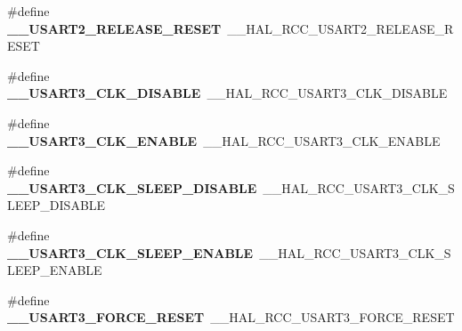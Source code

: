 \begin{DoxyCompactItemize}
\item 
\mbox{\label{group___h_a_l___r_c_c___aliased_ga0b8442b95cc856fb66c66874d511c5bb}} 
\#define {\bfseries \+\_\+\+\_\+\+U\+S\+A\+R\+T2\+\_\+\+R\+E\+L\+E\+A\+S\+E\+\_\+\+R\+E\+S\+ET}~\+\_\+\+\_\+\+H\+A\+L\+\_\+\+R\+C\+C\+\_\+\+U\+S\+A\+R\+T2\+\_\+\+R\+E\+L\+E\+A\+S\+E\+\_\+\+R\+E\+S\+ET
\item 
\mbox{\label{group___h_a_l___r_c_c___aliased_ga5493319829b9739c7495cc765162f4b3}} 
\#define {\bfseries \+\_\+\+\_\+\+U\+S\+A\+R\+T3\+\_\+\+C\+L\+K\+\_\+\+D\+I\+S\+A\+B\+LE}~\+\_\+\+\_\+\+H\+A\+L\+\_\+\+R\+C\+C\+\_\+\+U\+S\+A\+R\+T3\+\_\+\+C\+L\+K\+\_\+\+D\+I\+S\+A\+B\+LE
\item 
\mbox{\label{group___h_a_l___r_c_c___aliased_ga821236fc8d13c8b707128514c0a42a02}} 
\#define {\bfseries \+\_\+\+\_\+\+U\+S\+A\+R\+T3\+\_\+\+C\+L\+K\+\_\+\+E\+N\+A\+B\+LE}~\+\_\+\+\_\+\+H\+A\+L\+\_\+\+R\+C\+C\+\_\+\+U\+S\+A\+R\+T3\+\_\+\+C\+L\+K\+\_\+\+E\+N\+A\+B\+LE
\item 
\mbox{\label{group___h_a_l___r_c_c___aliased_ga32b28245d8d5a75b7182779315cb74d8}} 
\#define {\bfseries \+\_\+\+\_\+\+U\+S\+A\+R\+T3\+\_\+\+C\+L\+K\+\_\+\+S\+L\+E\+E\+P\+\_\+\+D\+I\+S\+A\+B\+LE}~\+\_\+\+\_\+\+H\+A\+L\+\_\+\+R\+C\+C\+\_\+\+U\+S\+A\+R\+T3\+\_\+\+C\+L\+K\+\_\+\+S\+L\+E\+E\+P\+\_\+\+D\+I\+S\+A\+B\+LE
\item 
\mbox{\label{group___h_a_l___r_c_c___aliased_gad2b6888f9a8ef85b727f7eabf6501d2f}} 
\#define {\bfseries \+\_\+\+\_\+\+U\+S\+A\+R\+T3\+\_\+\+C\+L\+K\+\_\+\+S\+L\+E\+E\+P\+\_\+\+E\+N\+A\+B\+LE}~\+\_\+\+\_\+\+H\+A\+L\+\_\+\+R\+C\+C\+\_\+\+U\+S\+A\+R\+T3\+\_\+\+C\+L\+K\+\_\+\+S\+L\+E\+E\+P\+\_\+\+E\+N\+A\+B\+LE
\item 
\mbox{\label{group___h_a_l___r_c_c___aliased_ga4f128e1456098323bd12668d7c934522}} 
\#define {\bfseries \+\_\+\+\_\+\+U\+S\+A\+R\+T3\+\_\+\+F\+O\+R\+C\+E\+\_\+\+R\+E\+S\+ET}~\+\_\+\+\_\+\+H\+A\+L\+\_\+\+R\+C\+C\+\_\+\+U\+S\+A\+R\+T3\+\_\+\+F\+O\+R\+C\+E\+\_\+\+R\+E\+S\+ET
\item 
\mbox{\label{group___h_a_l___r_c_c___aliased_gaab6dbb36cc19bb8ec325c5236fa8effe}} 

\end{DoxyCompactItemize}

